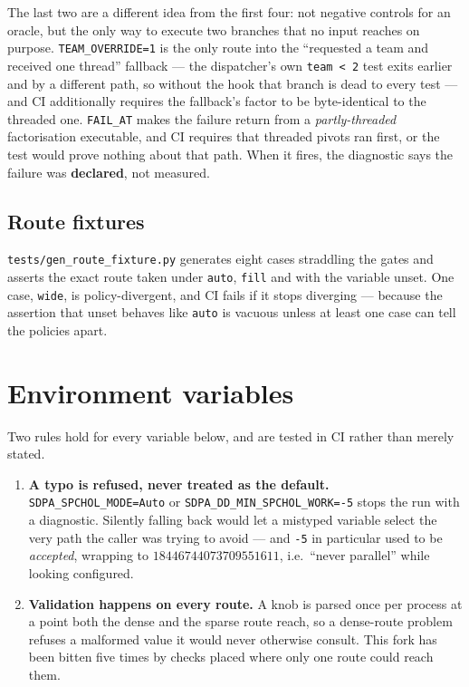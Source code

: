 \documentclass[11pt]{article}
\newcommand{\code}[1]{\texttt{#1}}
\begin{document}
The last two are a different idea from the first four: not negative controls for an oracle, but the
only way to execute two branches that no input reaches on purpose.
\code{TEAM\_OVERRIDE=1} is the only route into the ``requested a team and received one thread''
fallback --- the dispatcher's own \code{team < 2} test exits earlier and by a different path, so
without the hook that branch is dead to every test --- and CI additionally requires the fallback's
factor to be byte-identical to the threaded one. \code{FAIL\_AT} makes the failure return from a
\emph{partly-threaded} factorisation executable, and CI requires that threaded pivots ran first, or
the test would prove nothing about that path. When it fires, the diagnostic says the failure was
\textbf{declared}, not measured.

\subsection{Route fixtures}

\code{tests/gen\_route\_fixture.py} generates eight cases straddling the gates and asserts the exact
route taken under \code{auto}, \code{fill} and with the variable unset. One case, \code{wide}, is
policy-divergent, and CI fails if it stops diverging --- because the assertion that unset behaves
like \code{auto} is vacuous unless at least one case can tell the policies apart.

\section{Environment variables}

Two rules hold for every variable below, and are tested in CI rather than merely stated.

\begin{enumerate}
\item \textbf{A typo is refused, never treated as the default.} \code{SDPA\_SPCHOL\_MODE=Auto} or
      \code{SDPA\_DD\_MIN\_SPCHOL\_WORK=-5} stops the run with a diagnostic. Silently falling back
      would let a mistyped variable select the very path the caller was trying to avoid --- and
      \code{-5} in particular used to be \emph{accepted}, wrapping to
      $18446744073709551611$, i.e.\ ``never parallel'' while looking configured.
\item \textbf{Validation happens on every route.} A knob is parsed once per process at a point both
      the dense and the sparse route reach, so a dense-route problem refuses a malformed value it
      would never otherwise consult. This fork has been bitten five times by checks placed where
      only one route could reach them.
\end{enumerate}
\end{document}
